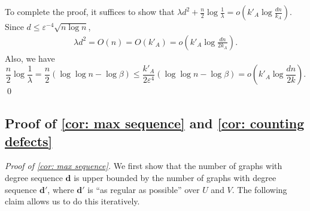 \documentclass[11pt]{article}
\newcommand{\eps}{\varepsilon}
\theoremstyle{plain}
\begin{document}
 To complete the proof, it suffices to show that  $\lambda  d^2 +\frac{n}{2}\log \frac{1}{\lambda } = o(k'_A\log \frac{dn}{k_A})$. Since $d \leq \eps^{-4}\sqrt{n\log n}$,
    \begin{align*}
        \lambda  d^2 = O(n) = O(k'_A) = o\left(k'_A\log\frac{dn}{2k_A}\right).
    \end{align*}
    Also, we have 
    \[
    \frac{n}{2}\log\frac{1}{\lambda } = \frac{n}{2}(\log\log n - \log\beta) \leq \frac{k'_A}{2\eps^4}(\log\log n  - \log \beta) = o\left(k'_A\log\frac{dn}{2k}\right).
    \]
\qed

\subsection{Proof of \cref{cor: max sequence} and \cref{cor: counting defects}}\label{sec: Defects}

\noindent\textit{Proof of \cref{cor: max sequence}.}
We first show that the number of graphs with degree sequence $\mathbf d$ is upper bounded by the number of graphs with degree sequence $\mathbf d'$, where $\mathbf d'$ is ``as regular as possible'' over $U$ and $V$. The following claim allows us to do this iteratively.
\end{document}

